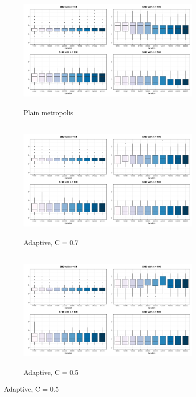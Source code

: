 \documentclass{report}
\begin{document}
\begin{figure}[!ht]
	\centering
	\begin{minipage}{\textwidth}
		\centering
		
		\begin{subfigure}[b]{0.45\textwidth}   
			\centering
			\includegraphics[width=\textwidth, height=6cm]{Figures/Overall_comparison/Boxplot_shd_iters_plain.png}
			\caption{Plain metropolis}
			\label{fig:box-plain}
		\end{subfigure}
		\hspace{0.35cm}  %
		\begin{subfigure}[b]{0.45\textwidth}   
			\centering
			\includegraphics[width=\textwidth, height=6cm]{Figures/Overall_comparison/Boxplot_shd_iters_c07.png}
			\caption{Adaptive, C = 0.7}
			\label{fig:box-c07}
		\end{subfigure}
		
		\vspace{0.4cm}   %
		
		\begin{subfigure}[b]{0.45\textwidth}   
			\centering
			\includegraphics[width=\textwidth, height=6cm]{Figures/Overall_comparison/Boxplot_shd_iters_c05.png}
			\caption{Adaptive, C = 0.5}
			\label{fig:box-c05}
		\end{subfigure}
	\end{minipage}
	

\end{figure}
\end{document}
